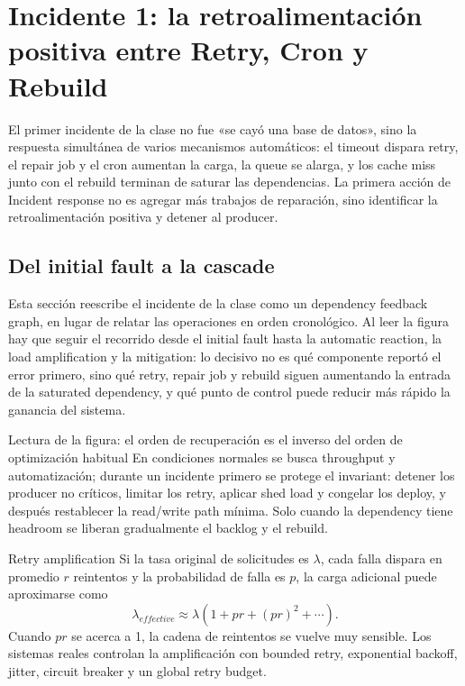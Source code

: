 \section{Incidente 1: la retroalimentación positiva entre Retry, Cron y Rebuild}

El primer incidente de la clase no fue «se cayó una base de datos», sino la respuesta simultánea de varios mecanismos automáticos: el timeout dispara retry, el repair job y el cron aumentan la carga, la queue se alarga, y los cache miss junto con el rebuild terminan de saturar las dependencias. La primera acción de Incident response no es agregar más trabajos de reparación, sino identificar la retroalimentación positiva y detener al producer.

\subsection{Del initial fault a la cascade}

Esta sección reescribe el incidente de la clase como un dependency feedback graph, en lugar de relatar las operaciones en orden cronológico. Al leer la figura hay que seguir el recorrido desde el initial fault hasta la automatic reaction, la load amplification y la mitigation: lo decisivo no es qué componente reportó el error primero, sino qué retry, repair job y rebuild siguen aumentando la entrada de la saturated dependency, y qué punto de control puede reducir más rápido la ganancia del sistema.


\begin{knowledgebox}{Lectura de la figura: el orden de recuperación es el inverso del orden de optimización habitual}
En condiciones normales se busca throughput y automatización; durante un incidente primero se protege el invariant: detener los producer no críticos, limitar los retry, aplicar shed load y congelar los deploy, y después restablecer la read/write path mínima. Solo cuando la dependency tiene headroom se liberan gradualmente el backlog y el rebuild.
\end{knowledgebox}

\begin{importantbox}{Retry amplification}
Si la tasa original de solicitudes es $\lambda$, cada falla dispara en promedio $r$ reintentos y la probabilidad de falla es $p$, la carga adicional puede aproximarse como
\[
\lambda_{effective}\approx \lambda(1+pr+(pr)^2+\cdots).
\]
Cuando $pr$ se acerca a 1, la cadena de reintentos se vuelve muy sensible. Los sistemas reales controlan la amplificación con bounded retry, exponential backoff, jitter, circuit breaker y un global retry budget.
\end{importantbox}

